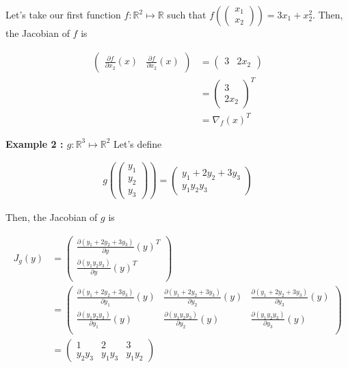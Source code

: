 \documentclass{tufte-handout}
\begin{document}
Let's take our first function $ f : \mathbb{R}^2 \mapsto \mathbb{R} $ such that $ f(\begin{pmatrix}
 x_1 \\ x_2
 \end{pmatrix}) = 3x_1 + x_2^2 $. Then, the Jacobian of $ f $ is 
 
\begin{align*}
\begin{pmatrix}
\frac{\partial f}{\partial x_2}(x) & \frac{\partial f}{\partial x_2}(x)
\end{pmatrix} &= 
\begin{pmatrix}
3 & 2x_2
\end{pmatrix}\\
&= \begin{pmatrix}
3\\2x_2
\end{pmatrix}^T\\
&= \nabla_f (x)^T
\end{align*} 

\textbf{Example 2 : $ g : \mathbb{R}^3 \mapsto \mathbb{R}^2 $}
 \label{example:jac2}
Let's define 

\begin{align*}
g (\begin{pmatrix}
y_1\\y_2\\y_3
\end{pmatrix}) 
=\begin{pmatrix}
y_1 + 2y_2 + 3y_3\\ y_1y_2y_3
\end{pmatrix}
\end{align*}


Then, the Jacobian of $ g $ is 

\begin{align*}
J_g(y) &= 
\begin{pmatrix}
\frac{\partial (y_1 + 2y_2 + 3y_3)}{\partial y}(y)^T\\
\frac{\partial (y_1y_2y_3)}{\partial y}(y)^T\\
\end{pmatrix}\\
&= 
\begin{pmatrix}
\frac{\partial (y_1 + 2y_2 + 3y_3)}{\partial y_1}(y) & \frac{\partial (y_1 + 2y_2 + 3y_3)}{\partial y_2}(y) & \frac{\partial (y_1 + 2y_2 + 3y_3)}{\partial y_3}(y)\\
\frac{\partial (y_1y_2y_3)}{\partial y_1}(y) & \frac{\partial (y_1y_2y_3)}{\partial y_2}(y) & \frac{\partial (y_1y_2y_3)}{\partial y_3}(y)\\
\end{pmatrix}\\
&=
\begin{pmatrix}
1 & 2 & 3\\
y_2y_3 &y_1y_3 & y_1y_2
\end{pmatrix}
\end{align*}
\end{document}
